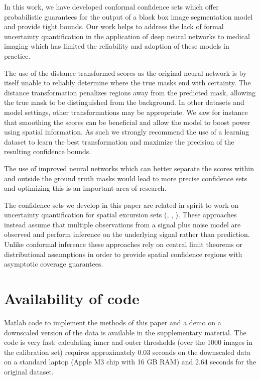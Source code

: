 In this work, we have developed conformal confidence sets which offer probabilistic guarantees for the output of a black box image segmentation model and provide tight bounds. Our work helps to address the lack of formal uncertainty quantification in the application of deep neural networks to medical imaging which has limited the reliability and adoption of these models in practice. 

The use of the distance transformed scores  as the original neural network is by itself unable to reliably determine where the true masks end with certainty. The distance transformation penalizes regions away from the predicted mask, allowing the true mask to be distinguished from the background. In other datasets and model settings, other transformations may be appropriate. We saw for instance that smoothing the scores can be beneficial and allow the model to boost power using spatial information. As such we strongly recommend the use of a learning dataset to learn the best transformation and maximize the precision of the resulting confidence bounds.

The use of improved neural networks which can better separate the scores within and outside the ground truth masks would lead to more precise confidence sets and optimizing this is an important area of research. 

The confidence sets we develop in this paper are related in spirit to work on uncertainty quantification for spatial excursion sets (\cite{chen2017density}, \cite{Bowring2019}, \cite{Mejia2020}). These approaches instead assume that multiple observations from a signal plus noise model are observed and perform inference on the underlying signal rather than prediction. Unlike conformal inference these approaches rely on central limit theorems or distributional assumptions in order to provide spatial confidence regions with asymptotic coverage guarantees. 

\section*{Availability of code}
\vspace{-0.1cm}
Matlab code to implement the methods of this paper and a demo on a downscaled version of the data is available in the supplementary material. The code is very fast: calculating inner and outer thresholds (over the 1000 images in the calibration set) requires approximately 0.03 seconds on the downscaled data on a standard laptop (Apple M3 chip with 16 GB RAM) and 2.64 seconds for the original dataset. 